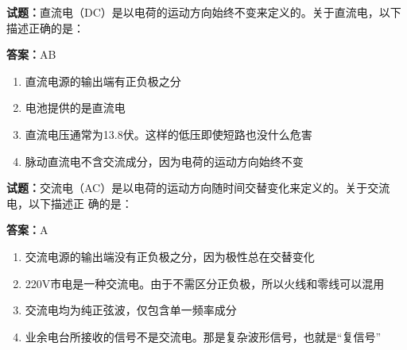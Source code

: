 \documentclass{ctexbook}
\begin{document}




\vspace{1em}

\textbf{试题：}直流电（DC）是以电荷的运动方向始终不变来定义的。关于直流电，以下描述正确的是： 

\textbf{答案：}AB 

\begin{enumerate}[leftmargin=3em]
  \item 直流电源的输出端有正负极之分 

  \item 电池提供的是直流电 

  \item 直流电压通常为13.8伏。这样的低压即使短路也没什么危害 

  \item 脉动直流电不含交流成分，因为电荷的运动方向始终不变 

\end{enumerate}





\vspace{1em}

\textbf{试题：}交流电（AC）是以电荷的运动方向随时间交替变化来定义的。关于交流电，以下描述正
确的是： 

\textbf{答案：}A 

\begin{enumerate}[leftmargin=3em]
  \item 交流电源的输出端没有正负极之分，因为极性总在交替变化 

  \item 220V市电是一种交流电。由于不需区分正负极，所以火线和零线可以混用 

  \item 交流电均为纯正弦波，仅包含单一频率成分 

  \item 业余电台所接收的信号不是交流电。那是复杂波形信号，也就是“复信号” 


\end{enumerate}





\vspace{1em}
\end{document}
